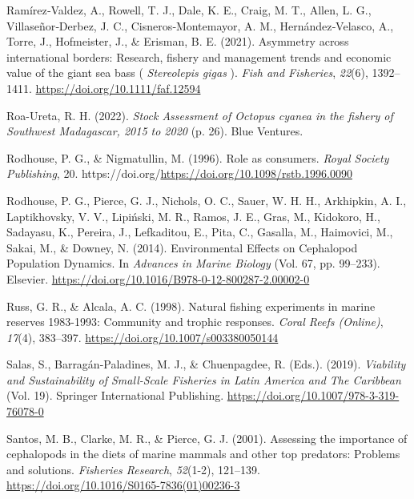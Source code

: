 \documentclass[
  12pt,
]{article}
\newlength{\cslhangindent}
\newlength{\cslentryspacingunit} %
\newenvironment{CSLReferences}[2] %
 {%
  \setlength{\parindent}{0pt}
  \ifodd #1
  \let\oldpar\par
  \def\par{\hangindent=\cslhangindent\oldpar}
  \fi
  \setlength{\parskip}{#2\cslentryspacingunit}
 }%
 {}
\begin{document}
\begin{CSLReferences}{1}{2}
\leavevmode{}%
Ramírez‐Valdez, A., Rowell, T. J., Dale, K. E., Craig, M. T., Allen, L. G., Villaseñor‐Derbez, J. C., Cisneros‐Montemayor, A. M., Hernández‐Velasco, A., Torre, J., Hofmeister, J., \& Erisman, B. E. (2021). Asymmetry across international borders: {Research}, fishery and management trends and economic value of the giant sea bass ( \emph{{Stereolepis} gigas} ). \emph{Fish and Fisheries}, \emph{22}(6), 1392--1411. \url{https://doi.org/10.1111/faf.12594}

\leavevmode{}%
Roa-Ureta, R. H. (2022). \emph{Stock {Assessment} of {Octopus} cyanea in the fishery of {Southwest} {Madagascar}, 2015 to 2020} (p. 26). Blue Ventures.

\leavevmode{}%
Rodhouse, P. G., \& Nigmatullin, M. (1996). Role as consumers. \emph{Royal Society Publishing}, 20. https://doi.org/\url{https://doi.org/10.1098/rstb.1996.0090}

\leavevmode{}%
Rodhouse, P. G., Pierce, G. J., Nichols, O. C., Sauer, W. H. H., Arkhipkin, A. I., Laptikhovsky, V. V., Lipiński, M. R., Ramos, J. E., Gras, M., Kidokoro, H., Sadayasu, K., Pereira, J., Lefkaditou, E., Pita, C., Gasalla, M., Haimovici, M., Sakai, M., \& Downey, N. (2014). Environmental {Effects} on {Cephalopod} {Population} {Dynamics}. In \emph{Advances in {Marine} {Biology}} (Vol. 67, pp. 99--233). Elsevier. \url{https://doi.org/10.1016/B978-0-12-800287-2.00002-0}

\leavevmode{}%
Russ, G. R., \& Alcala, A. C. (1998). Natural fishing experiments in marine reserves 1983-1993: Community and trophic responses. \emph{Coral Reefs (Online)}, \emph{17}(4), 383--397. \url{https://doi.org/10.1007/s003380050144}

\leavevmode{}%
Salas, S., Barragán-Paladines, M. J., \& Chuenpagdee, R. (Eds.). (2019). \emph{Viability and {Sustainability} of {Small}-{Scale} {Fisheries} in {Latin} {America} and {The} {Caribbean}} (Vol. 19). Springer International Publishing. \url{https://doi.org/10.1007/978-3-319-76078-0}

\leavevmode{}%
Santos, M. B., Clarke, M. R., \& Pierce, G. J. (2001). Assessing the importance of cephalopods in the diets of marine mammals and other top predators: Problems and solutions. \emph{Fisheries Research}, \emph{52}(1-2), 121--139. \url{https://doi.org/10.1016/S0165-7836(01)00236-3}


\end{CSLReferences}
\end{document}
